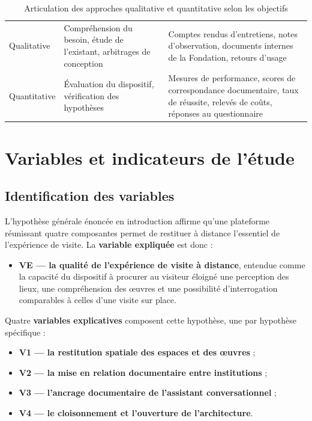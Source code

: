 \begin{table}[htbp]
\centering
\caption{Articulation des approches qualitative et quantitative selon les objectifs}
\label{tab:approche}
\small
\begin{tabularx}{\textwidth}{|L{2.4cm}|L{3.4cm}|X|}
\hline
{}
 &  &  \\ \hline
Qualitative & Compréhension du besoin, étude de l'existant, arbitrages de conception &
Comptes rendus d'entretiens, notes d'observation, documents internes de la Fondation, retours d'usage \\ \hline
Quantitative & Évaluation du dispositif, vérification des hypothèses &
Mesures de performance, scores de correspondance documentaire, taux de réussite, relevés de coûts, réponses au questionnaire \\ \hline
\end{tabularx}
\end{table}

\section{Variables et indicateurs de l'étude}
\label{sec:variables}

\subsection{Identification des variables}

L'hypothèse générale énoncée en introduction affirme qu'une plateforme réunissant
quatre composantes permet de restituer à distance l'essentiel de l'expérience de
visite. La \textbf{variable expliquée} est donc :

\begin{itemize}
  \item \textbf{VE — la qualité de l'expérience de visite à distance}, entendue
        comme la capacité du dispositif à procurer au visiteur éloigné une
        perception des lieux, une compréhension des œuvres et une possibilité
        d'interrogation comparables à celles d'une visite sur place.
\end{itemize}

Quatre \textbf{variables explicatives} composent cette hypothèse, une par
hypothèse spécifique :

\begin{itemize}
  \item \textbf{V1 — la restitution spatiale des espaces et des œuvres} ;
  \item \textbf{V2 — la mise en relation documentaire entre institutions} ;
  \item \textbf{V3 — l'ancrage documentaire de l'assistant conversationnel} ;
  \item \textbf{V4 — le cloisonnement et l'ouverture de l'architecture}.
\end{itemize}

